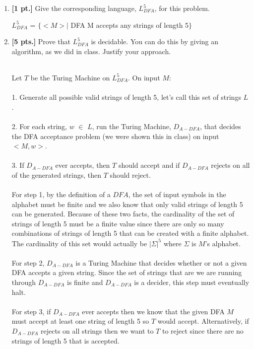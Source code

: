 \documentclass[11pt]{article}
\theoremstyle{definition}
\theoremstyle{theorem}
\newcommand{\solution}{\medskip\noindent{\color{blue}\textbf{Solution:}}}
\begin{document}
\begin{enumerate}[label=(\alph*)]

\item \textbf{[1 pt.]} Give the corresponding language, $L^5_{DFA}$, for this problem.

\solution

$L^5_{DFA}$ = $\{<M> |$ DFA M accepts any strings of length 5$\}$


\item \textbf{[5 pts.]} Prove that $L^5_{DFA}$ is decidable. You can do this by giving an algorithm, as we did in class. Justify your approach.

\solution
\\
Let $T$ be the Turing Machine on $L^5_{DFA}$. On input $M$: \\ ~ \\
1. Generate all possible valid strings of length 5, let's call this set of strings $L$. \\ ~ \\
2. For each string, $w$ $\in$ $L$, run the Turing Machine, $D_{A-DFA}$, that decides the DFA acceptance problem (we were shown this in class) on input $<M, w>$. \\ ~ \\
3. If $D_{A-DFA}$ ever accepts, then $T$ should accept and if $D_{A-DFA}$ rejects on all of the generated strings, then $T$ should reject. \\ ~ \\


For step 1, by the definition of a $DFA$, the set of input symbols in the alphabet must be finite and we also know that only valid strings of length 5 can be generated.
Because of these two facts, the cardinality of the set of strings of length 5 must be a finite value since there are only so many combinations of strings of length 5 that can be created with a finite alphabet. The cardinality of this set would actually be $|\Sigma|^5$ where $\Sigma$ is $M$'s alphabet. \\ ~ \\
For step 2, $D_{A-DFA}$ is a Turing Machine that decides whether or not a given DFA accepts a given string. Since the set of strings that are we are running through $D_{A-DFA}$ is finite and $D_{A-DFA}$ is a decider, this step must eventually halt. \\ ~ \\
For step 3, if $D_{A-DFA}$ ever accepts then we know that the given DFA $M$ must accept at least one string of length 5 so $T$ would accept. Alternatively, if $D_{A-DFA}$ rejects on all strings then we want to $T$ to reject since there are no strings of length 5 that is accepted.



\end{enumerate}
\end{document}
